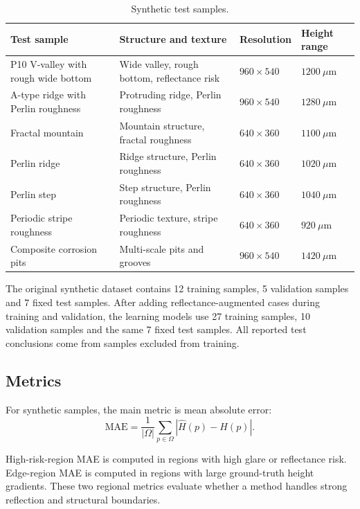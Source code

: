 \documentclass[11pt,a4paper]{article}
\begin{document}
\begin{table}[htbp]
\centering
\caption{Synthetic test samples.}
\small
\begin{tabularx}{\textwidth}{p{}Xp{}p{}}
\toprule
Test sample & Structure and texture & Resolution & Height range \\
\midrule
P10 V-valley with rough wide bottom & Wide valley, rough bottom, reflectance risk & \(960 \times 540\) & \(1200~\mu\mathrm{m}\) \\
A-type ridge with Perlin roughness & Protruding ridge, Perlin roughness & \(960 \times 540\) & \(1280~\mu\mathrm{m}\) \\
Fractal mountain & Mountain structure, fractal roughness & \(640 \times 360\) & \(1100~\mu\mathrm{m}\) \\
Perlin ridge & Ridge structure, Perlin roughness & \(640 \times 360\) & \(1020~\mu\mathrm{m}\) \\
Perlin step & Step structure, Perlin roughness & \(640 \times 360\) & \(1040~\mu\mathrm{m}\) \\
Periodic stripe roughness & Periodic texture, stripe roughness & \(640 \times 360\) & \(920~\mu\mathrm{m}\) \\
Composite corrosion pits & Multi-scale pits and grooves & \(960 \times 540\) & \(1420~\mu\mathrm{m}\) \\
\bottomrule
\end{tabularx}
\end{table}

The original synthetic dataset contains 12 training samples, 5 validation samples and 7 fixed test samples. After adding reflectance-augmented cases during training and validation, the learning models use 27 training samples, 10 validation samples and the same 7 fixed test samples. All reported test conclusions come from samples excluded from training.

\subsection{Metrics}

For synthetic samples, the main metric is mean absolute error:
\begin{equation}
\mathrm{MAE}=\frac{1}{|\Omega|}\sum_{p\in\Omega}|\hat{H}(p)-H(p)|.
\end{equation}

High-risk-region MAE is computed in regions with high glare or reflectance risk. Edge-region MAE is computed in regions with large ground-truth height gradients. These two regional metrics evaluate whether a method handles strong reflection and structural boundaries.
\end{document}
